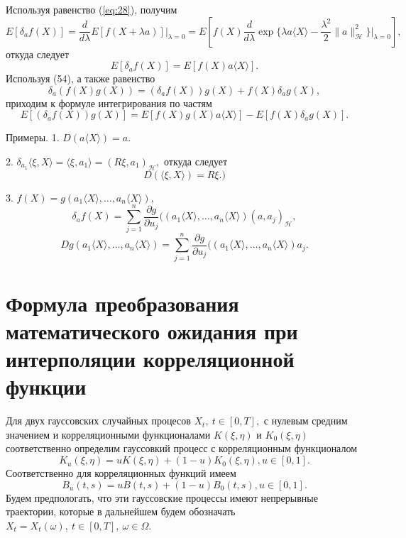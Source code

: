 \documentclass [12pt]{report}
\begin{document}
Используя равенство (\ref{eq:28}), получим
$$E[\delta_a f(X)]=
 \frac{d}{d\lambda}E[f(X+\lambda a)]\Big|_{\lambda=0}=
 E[f(X)\frac{d}{d\lambda}
 \exp\Big\{\lambda a\langle X\rangle-
 \frac{\lambda^2}{2}\|a\|^2_{\mathcal{H}}\Big\}\Big|_{\lambda=0}],$$
откуда следует
\begin{equation}\label{eq:32}
E[\delta_a f(X)]=E[f(X)a\langle X\rangle].
\end{equation}
Используя (54), а также равенство
\begin{equation}\label{eq:33}
\delta_a(f(X)g(X))=(\delta_a f(X))g(X)+f(X)\delta_a g(X),
\end{equation}
приходим к формуле интегрирования по частям
\begin{equation}\label{eq:34}
E[(\delta_a f(X))g(X)]= E[f(X)g(X)a\langle X\rangle]-E[f(X)\delta_a g(X)].
\end{equation}

Примеры. 1. $D(a\langle X\rangle)=a.$

2. $\delta_{a_1}\langle\xi,X\rangle=\langle\xi,a_1\rangle=
(R\xi,a_1)_\mathcal{H},$
откуда следует
\begin{equation}\label{eq:35}
D(\langle\xi,X\rangle)=R\xi.)
\end{equation}

3. $f(X)=g(a_1\langle X\rangle,\ldots,a_n\langle X\rangle),$
$$
\delta_a f(X)=\sum\limits_{j=1}^n \frac{\partial g}{\partial u_j}
((a_1\langle X\rangle,\ldots,a_n\langle X\rangle)(a,a_j)_\mathcal{H},
$$
$$
Dg(a_1\langle X\rangle,\ldots,a_n\langle X\rangle)=
\sum\limits_{j=1}^n \frac{\partial g}{\partial u_j}
((a_1\langle X\rangle,\ldots,a_n\langle X\rangle)a_j.
$$

\newpage

\chapter{Формула преобразования математического ожидания при интерполяции корреляционной функции}

Для двух гауссовских случайных процесов $X_t,~ t\in[0, T],$
с нулевым средним значением и корреляционными функционалами $K(\xi,\eta)$ и $K_0(\xi,\eta)$ соответственно
определим гауссовкий процесс с корреляционным функционалом
$$
K_u(\xi,\eta)= uK(\xi,\eta)+ (1 - u)K_0(\xi,\eta), u \in [0, 1].
$$
Соответственно для корреляционных функций имеем
$$
B_u(t,s)= uB(t,s)+ (1 - u)B_0(t,s), u \in [0, 1].
$$
Будем предпологать, что эти гауссовские процессы имеют непрерывные траектории,
которые в дальнейшем будем обозначать $X_t = X_t(\omega),~ t \in [0, T],~ \omega \in \Omega.$\
\end{document}
